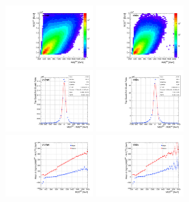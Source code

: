 \begin{figure}
  \begin{center}
    \includegraphics[width=0.30\textwidth]{fig_fullRun2UL/KinRecoResolutions/ttbar_mass_genreco_prompt.pdf}
    \includegraphics[width=0.30\textwidth]{fig_fullRun2UL/KinRecoResolutions/ttbar_mass_genreco_viatau.pdf}\\
    \includegraphics[width=0.30\textwidth]{fig_fullRun2UL/KinRecoResolutions/ttbar_mass_residual_prompt.pdf}
    \includegraphics[width=0.30\textwidth]{fig_fullRun2UL/KinRecoResolutions/ttbar_mass_residual_viatau.pdf}\\
    \includegraphics[width=0.30\textwidth]{fig_fullRun2UL/KinRecoResolutions/ttbar_mass_multiresidual_prompt.pdf}
    \includegraphics[width=0.30\textwidth]{fig_fullRun2UL/KinRecoResolutions/ttbar_mass_multiresidual_viatau.pdf}\\

\end{center}
\end{figure}
